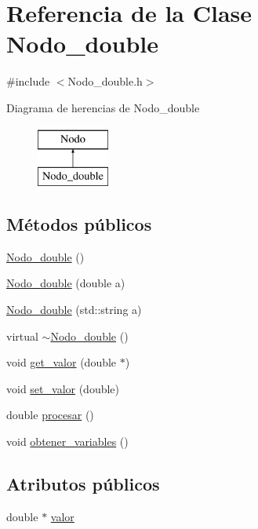 \hypertarget{class_nodo__double}{}\section{Referencia de la Clase Nodo\+\_\+double}
\label{class_nodo__double}


{\ttfamily \#include $<$Nodo\+\_\+double.\+h$>$}

Diagrama de herencias de Nodo\+\_\+double\begin{figure}[H]
\begin{center}
\leavevmode
\includegraphics[height=2.000000cm]{class_nodo__double}
\end{center}
\end{figure}
\subsection*{Métodos públicos}
\begin{DoxyCompactItemize}
\item 
\hyperlink{class_nodo__double_a27c5b79400ab015339de2c5f898e81ce}{Nodo\+\_\+double} ()
\item 
\hyperlink{class_nodo__double_a165c997a53adf1f69e871da9e4bf8823}{Nodo\+\_\+double} (double a)
\item 
\hyperlink{class_nodo__double_af1e0ccdd5719def6ba57855bab6f1f81}{Nodo\+\_\+double} (std\+::string a)
\item 
virtual \hyperlink{class_nodo__double_a91facad1ce7ffef3ce80d5faff0016c5}{$\sim$\+Nodo\+\_\+double} ()
\item 
void \hyperlink{class_nodo__double_a4eb67c264f37c66d101d832ec981717b}{get\+\_\+valor} (double $\ast$)
\item 
void \hyperlink{class_nodo__double_a46f39301fcb3971e1d452be7bdf6f35a}{set\+\_\+valor} (double)
\item 
double \hyperlink{class_nodo__double_ac1062fd8a1c495f32b10be1a1e371748}{procesar} ()
\item 
void \hyperlink{class_nodo__double_a92a96c692af58eb4197ae64e085beb41}{obtener\+\_\+variables} ()
\end{DoxyCompactItemize}
\subsection*{Atributos públicos}
\begin{DoxyCompactItemize}
\item 
double $\ast$ \hyperlink{class_nodo__double_a8a9a0dc98d04e88ca67d517efb9764df}{valor}
\end{DoxyCompactItemize}


